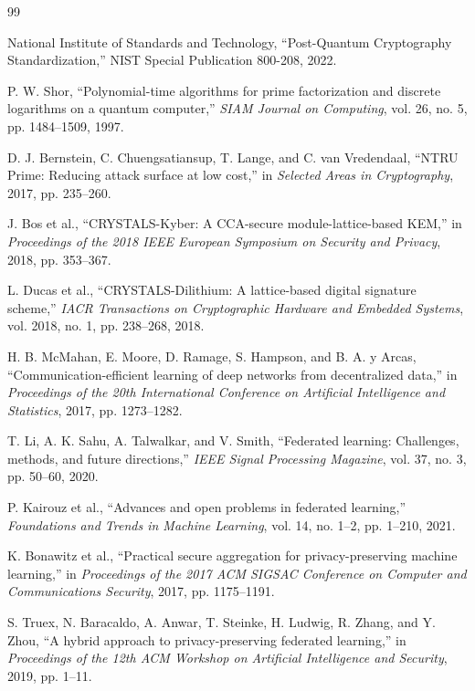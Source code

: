 \documentclass[12pt,a4paper,twoside]{book}
\begin{document}
\begin{thebibliography}{99}

National Institute of Standards and Technology, ``Post-Quantum Cryptography Standardization,'' NIST Special Publication 800-208, 2022.

P. W. Shor, ``Polynomial-time algorithms for prime factorization and discrete logarithms on a quantum computer,'' \textit{SIAM Journal on Computing}, vol. 26, no. 5, pp. 1484--1509, 1997.

D. J. Bernstein, C. Chuengsatiansup, T. Lange, and C. van Vredendaal, ``NTRU Prime: Reducing attack surface at low cost,'' in \textit{Selected Areas in Cryptography}, 2017, pp. 235--260.

J. Bos et al., ``CRYSTALS-Kyber: A CCA-secure module-lattice-based KEM,'' in \textit{Proceedings of the 2018 IEEE European Symposium on Security and Privacy}, 2018, pp. 353--367.

L. Ducas et al., ``CRYSTALS-Dilithium: A lattice-based digital signature scheme,'' \textit{IACR Transactions on Cryptographic Hardware and Embedded Systems}, vol. 2018, no. 1, pp. 238--268, 2018.

H. B. McMahan, E. Moore, D. Ramage, S. Hampson, and B. A. y Arcas, ``Communication-efficient learning of deep networks from decentralized data,'' in \textit{Proceedings of the 20th International Conference on Artificial Intelligence and Statistics}, 2017, pp. 1273--1282.

T. Li, A. K. Sahu, A. Talwalkar, and V. Smith, ``Federated learning: Challenges, methods, and future directions,'' \textit{IEEE Signal Processing Magazine}, vol. 37, no. 3, pp. 50--60, 2020.

P. Kairouz et al., ``Advances and open problems in federated learning,'' \textit{Foundations and Trends in Machine Learning}, vol. 14, no. 1--2, pp. 1--210, 2021.

K. Bonawitz et al., ``Practical secure aggregation for privacy-preserving machine learning,'' in \textit{Proceedings of the 2017 ACM SIGSAC Conference on Computer and Communications Security}, 2017, pp. 1175--1191.

S. Truex, N. Baracaldo, A. Anwar, T. Steinke, H. Ludwig, R. Zhang, and Y. Zhou, ``A hybrid approach to privacy-preserving federated learning,'' in \textit{Proceedings of the 12th ACM Workshop on Artificial Intelligence and Security}, 2019, pp. 1--11.


\end{thebibliography}
\end{document}
